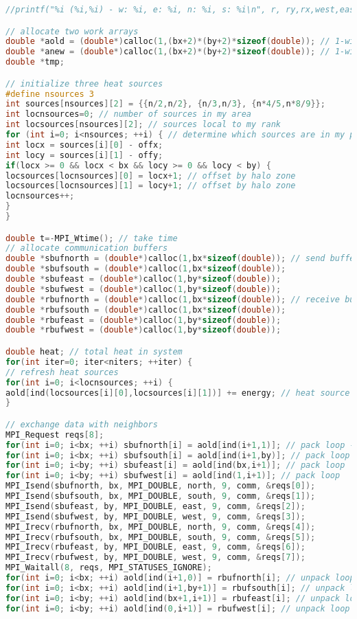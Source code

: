\begin{lstlisting}[language=C, label={lst_stencpara}, caption={stencil\_mpi.c.}]
//printf("%i (%i,%i) - w: %i, e: %i, n: %i, s: %i\n", r, ry,rx,west,east,north,south);

// allocate two work arrays
double *aold = (double*)calloc(1,(bx+2)*(by+2)*sizeof(double)); // 1-wide halo zones!
double *anew = (double*)calloc(1,(bx+2)*(by+2)*sizeof(double)); // 1-wide halo zones!
double *tmp;

// initialize three heat sources
#define nsources 3
int sources[nsources][2] = {{n/2,n/2}, {n/3,n/3}, {n*4/5,n*8/9}};
int locnsources=0; // number of sources in my area
int locsources[nsources][2]; // sources local to my rank
for (int i=0; i<nsources; ++i) { // determine which sources are in my patch
int locx = sources[i][0] - offx;
int locy = sources[i][1] - offy;
if(locx >= 0 && locx < bx && locy >= 0 && locy < by) {
locsources[locnsources][0] = locx+1; // offset by halo zone
locsources[locnsources][1] = locy+1; // offset by halo zone
locnsources++;
}
}

double t=-MPI_Wtime(); // take time
// allocate communication buffers
double *sbufnorth = (double*)calloc(1,bx*sizeof(double)); // send buffers
double *sbufsouth = (double*)calloc(1,bx*sizeof(double));
double *sbufeast = (double*)calloc(1,by*sizeof(double));
double *sbufwest = (double*)calloc(1,by*sizeof(double));
double *rbufnorth = (double*)calloc(1,bx*sizeof(double)); // receive buffers
double *rbufsouth = (double*)calloc(1,bx*sizeof(double));
double *rbufeast = (double*)calloc(1,by*sizeof(double));
double *rbufwest = (double*)calloc(1,by*sizeof(double));

double heat; // total heat in system
for(int iter=0; iter<niters; ++iter) {
// refresh heat sources
for(int i=0; i<locnsources; ++i) {
aold[ind(locsources[i][0],locsources[i][1])] += energy; // heat source
}

// exchange data with neighbors
MPI_Request reqs[8];
for(int i=0; i<bx; ++i) sbufnorth[i] = aold[ind(i+1,1)]; // pack loop - last valid region
for(int i=0; i<bx; ++i) sbufsouth[i] = aold[ind(i+1,by)]; // pack loop
for(int i=0; i<by; ++i) sbufeast[i] = aold[ind(bx,i+1)]; // pack loop
for(int i=0; i<by; ++i) sbufwest[i] = aold[ind(1,i+1)]; // pack loop
MPI_Isend(sbufnorth, bx, MPI_DOUBLE, north, 9, comm, &reqs[0]);
MPI_Isend(sbufsouth, bx, MPI_DOUBLE, south, 9, comm, &reqs[1]);
MPI_Isend(sbufeast, by, MPI_DOUBLE, east, 9, comm, &reqs[2]);
MPI_Isend(sbufwest, by, MPI_DOUBLE, west, 9, comm, &reqs[3]);
MPI_Irecv(rbufnorth, bx, MPI_DOUBLE, north, 9, comm, &reqs[4]);
MPI_Irecv(rbufsouth, bx, MPI_DOUBLE, south, 9, comm, &reqs[5]);
MPI_Irecv(rbufeast, by, MPI_DOUBLE, east, 9, comm, &reqs[6]);
MPI_Irecv(rbufwest, by, MPI_DOUBLE, west, 9, comm, &reqs[7]);
MPI_Waitall(8, reqs, MPI_STATUSES_IGNORE);
for(int i=0; i<bx; ++i) aold[ind(i+1,0)] = rbufnorth[i]; // unpack loop - into ghost cells
for(int i=0; i<bx; ++i) aold[ind(i+1,by+1)] = rbufsouth[i]; // unpack loop
for(int i=0; i<by; ++i) aold[ind(bx+1,i+1)] = rbufeast[i]; // unpack loop
for(int i=0; i<by; ++i) aold[ind(0,i+1)] = rbufwest[i]; // unpack loop


\end{lstlisting}
